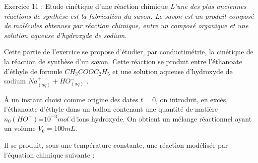 \documentclass[12pt, french]{article}
\begin{document}
\begin{Box2}{Exercice 11 : Etude cinétique d’une réaction chimique}
	\emph{L’une des plus anciennes réactions
de synthèse est
la fabrication
du savon. Le savon est un produit
composé de molécules obtenues par réaction chimique, entre un composé organique et une solution
aqueuse d'hydroxyde de sodium.}

Cette partie de l’exercice se propose d’étudier, par conductimétrie, la cinétique de la réaction de
synthèse d’un savon. Cette réaction se produit entre l’éthanoate d’éthyle de formule $CH_3COOC_2H_5$ et une solution aqueuse d’hydroxyde de sodium $Na^+_{(aq)} + HO^-_{(aq)}$ .

À un instant choisi comme origine des dates $t = 0$, on introduit, en excès, l’éthanoate d’éthyle dans un
ballon contenant une quantité de matière $n_0(HO^-)$=$10^{-3}mol$ d’ions hydroxyde. On obtient un
mélange réactionnel ayant un volume $V_0 = 100mL$.

Il se produit, sous une température constante, une réaction modélisée par l’équation chimique
suivante :

\end{Box2}
\end{document}
